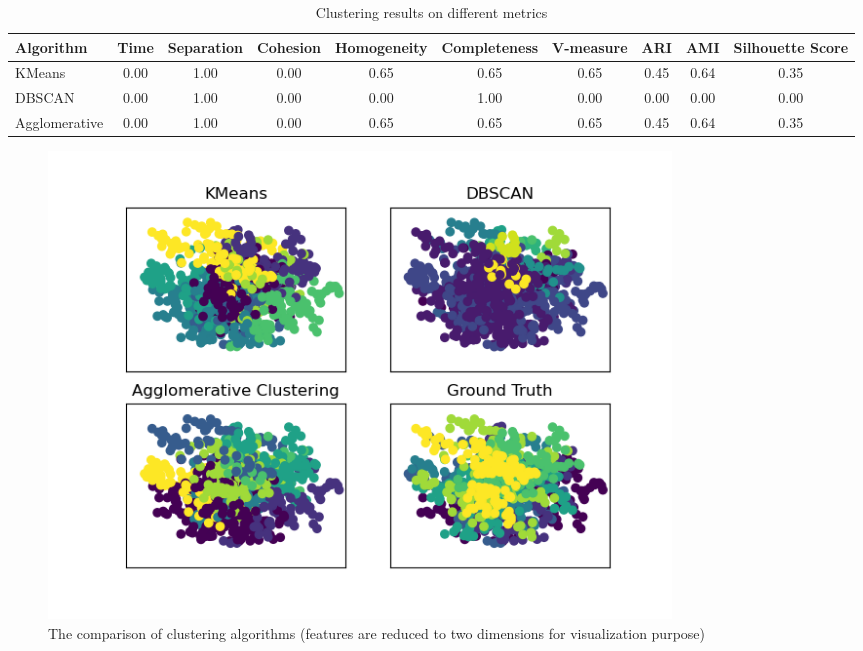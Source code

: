 \documentclass[12pt,a4paper]{article}
\begin{document}
\begin{table}[htbp]
    \centering
    \begin{tabular}{lccccccccc}
        \toprule
        \textbf{Algorithm} & \textbf{Time} & \textbf{Separation} & \textbf{Cohesion} & \textbf{Homogeneity} & \textbf{Completeness} & \textbf{V-measure} & \textbf{ARI} & \textbf{AMI} & \textbf{Silhouette Score} \\
        \midrule
        KMeans & 0.00 & 1.00 & 0.00 & 0.65 & 0.65 & 0.65 & 0.45 & 0.64 & 0.35 \\
        DBSCAN & 0.00 & 1.00 & 0.00 & 0.00 & 1.00 & 0.00 & 0.00 & 0.00 & 0.00 \\
        Agglomerative & 0.00 & 1.00 & 0.00 & 0.65 & 0.65 & 0.65 & 0.45 & 0.64 & 0.35 \\
        \bottomrule
    \end{tabular}
    \caption{Clustering results on different metrics}
    \label{tab:clustering_results}
\end{table}

\begin{figure}[h]
    \centering
    \includegraphics[width=0.8\textwidth]{figures/clustering_result_comparison.png}
    \caption{The comparison of clustering algorithms (features are reduced to two dimensions for visualization purpose)}
    \label{fig:comparison_clustering}
\end{figure}
\end{document}
